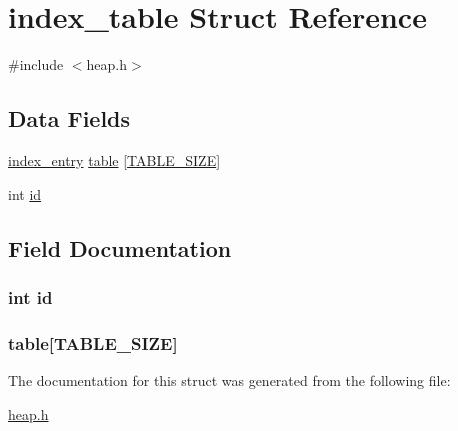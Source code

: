 \hypertarget{structindex__table}{}\section{index\+\_\+table Struct Reference}
\label{structindex__table}


{\ttfamily \#include $<$heap.\+h$>$}

\subsection*{Data Fields}
\begin{DoxyCompactItemize}
\item 
\hyperlink{structindex__entry}{index\+\_\+entry} \hyperlink{structindex__table_ac79481e508bbe68d18d747f7af369986}{table} \mbox{[}\hyperlink{heap_8h_a032503e76d6f69bc67e99e909c8125da}{T\+A\+B\+L\+E\+\_\+\+S\+I\+Z\+E}\mbox{]}
\item 
int \hyperlink{structindex__table_a7441ef0865bcb3db9b8064dd7375c1ea}{id}
\end{DoxyCompactItemize}


\subsection{Field Documentation}
\hypertarget{structindex__table_a7441ef0865bcb3db9b8064dd7375c1ea}{}
\subsubsection[{id}]{\setlength{\rightskip}{0pt plus 5cm}int id}\label{structindex__table_a7441ef0865bcb3db9b8064dd7375c1ea}
\hypertarget{structindex__table_ac79481e508bbe68d18d747f7af369986}{}
\subsubsection[{table}]{ table\mbox{[}{\bf T\+A\+B\+L\+E\+\_\+\+S\+I\+Z\+E}\mbox{]}}\label{structindex__table_ac79481e508bbe68d18d747f7af369986}


The documentation for this struct was generated from the following file\+:\begin{DoxyCompactItemize}
\item 
\hyperlink{heap_8h}{heap.\+h}\end{DoxyCompactItemize}
